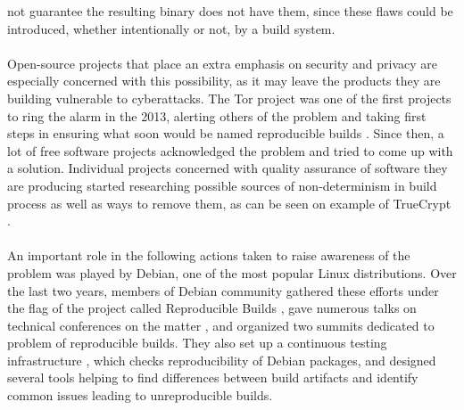 {not guarantee the resulting binary does not have them, since these flaws could be introduced,
whether intentionally or not, by a build system. \\\\
Open-source projects that place an extra emphasis on security
and privacy are especially concerned with this possibility, as
it may leave the products they are building vulnerable to cyberattacks.
The Tor project was one of the first projects to ring the alarm in the 2013, alerting others of the problem and taking first steps
in ensuring what soon would be named reproducible builds \autocite{tor13, tor14}.
Since then, a lot of free software projects acknowledged the problem and
tried to come up with a solution. Individual projects concerned with quality
assurance of software they are producing started researching possible sources of
non-determinism in build process as well as ways to remove them, as can be
seen on example of TrueCrypt \autocite{de2014challenges}.\\\\
An important role in the following actions taken to raise awareness of the
problem was played by Debian, one of the most popular Linux distributions.
Over the last two years, members of Debian community gathered these efforts
under the flag of the project called Reproducible Builds \autocite{rb},
gave numerous talks on technical conferences on the matter
\autocite{Lun14, lca2017_valerie}, and organized
two summits dedicated to problem of reproducible builds. They also set up a continuous
testing infrastructure \autocite{tests-rbo}, which checks reproducibility
of Debian packages, and designed several tools helping to find
differences between build artifacts and identify common issues leading to
unreproducible builds.}
